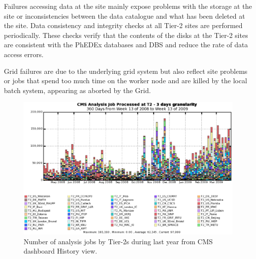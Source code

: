 Failures accessing data at the site mainly expose problems with the storage at the site or inconsistencies between the data catalogue and what has been deleted at the site. 
Data consistency and integrity checks at all Tier-2 sites are performed periodically. These checks verify that the contents of the disks at the Tier-2 sites are consistent with the PhEDEx databases and DBS and reduce the rate of data access errors.

Grid failures are due to the underlying grid system but also reflect site problems or jobs that spend too much time on the worker node and are killed by the local batch system, appearing as aborted by the Grid.


%
%
\begin{figure}
\centering
\includegraphics[width=1.02\textwidth]{AnalysisJobHistoryApril0809.eps}
\caption{Number of analysis jobs by Tier-2s during last year from CMS dashboard History view. }
\label{fig:AnalysisJobHistoryApril0809}
\end{figure}
